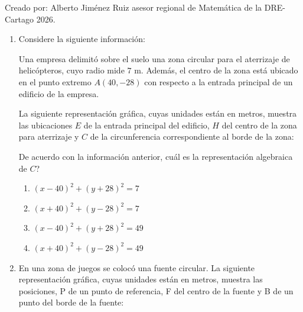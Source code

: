 \documentclass[12pt]{article}
\newcommand{\opcion}[2]{\item $#2$}
\newcommand{\puntografico}{0.09}
\newcommand{\puntodestacado}{0.16}
\begin{document}
\vspace{8pt}
\noindent Creado por: Alberto Jim\'enez Ruiz asesor regional de Matem\'atica de la DRE-Cartago 2026.

\newpage

\begin{enumerate}[label=\textbf{\arabic*.}, itemsep=2.5cm]

\Needspace{0.55\textheight}
\item
Considere la siguiente informaci\'on:

Una empresa delimit\'o sobre el suelo una zona circular para el aterrizaje de helic\'opteros, cuyo radio mide $7$ m. Adem\'as, el centro de la zona est\'a ubicado en el punto extremo $A(40,-28)$ con respecto a la entrada principal de un edificio de la empresa.

La siguiente representaci\'on gr\'afica, cuyas unidades est\'an en metros, muestra las ubicaciones $E$ de la entrada principal del edificio, $H$ del centro de la zona para aterrizaje y $C$ de la circunferencia correspondiente al borde de la zona:

\begin{center}
\end{center}

De acuerdo con la informaci\'on anterior, \textquestiondown cu\'al es la representaci\'on algebraica de $C$?

\begin{enumerate}[label=\Alph*)]
  \opcion{A}{(x-40)^2+(y+28)^2=7}
  \opcion{B}{(x+40)^2+(y-28)^2=7}
  \opcion{C}{(x-40)^2+(y+28)^2=49}
  \opcion{D}{(x+40)^2+(y-28)^2=49}
\end{enumerate}

\Needspace{0.90\textheight}
\item
En una zona de juegos se coloc\'o una fuente circular. La siguiente representaci\'on gr\'afica, cuyas unidades est\'an en metros, muestra las posiciones, P de un punto de referencia, F del centro de la fuente y B de un punto del borde de la fuente:


\end{enumerate}
\end{document}
